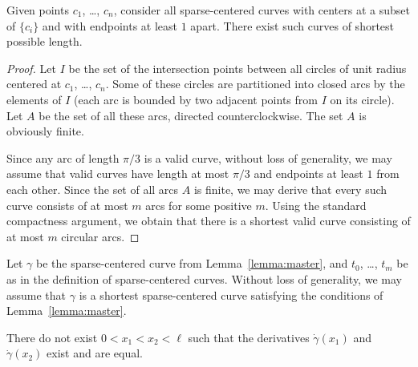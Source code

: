 \begin{observation}
Given points $c_1$, \ldots, $c_n$, consider all sparse-centered curves with centers at a subset of $\{c_i\}$ and with endpoints at least $1$ apart.
There exist such curves of shortest possible length.
\end{observation}

\begin{proof}
%
Let $I$ be the set of the intersection points between all circles of unit radius centered at $c_1$, \ldots, $c_n$. Some of these circles are partitioned into closed arcs by the elements of $I$ (each arc is bounded by two adjacent points from $I$ on its circle). Let $A$ be the set of all these arcs, directed counterclockwise. The set $A$ is obviously finite.

Since any arc of length $\pi/3$ is a valid curve, without loss of generality, we may assume that valid curves have length at most $\pi/3$ and endpoints at least $1$ from each other. Since the set of all arcs $A$ is finite, we may derive that every such curve consists of at most $m$ arcs for some positive $m$.
Using the standard compactness argument, we obtain that there is a shortest valid curve consisting of at most $m$ circular arcs.
\end{proof}

Let $\gamma$ be the sparse-centered curve from Lemma~\ref{lemma:master}, and $t_0$, \ldots, $t_m$ be as in the definition of sparse-centered curves.
Without loss of generality, we may assume that $\gamma$ is a shortest sparse-centered curve satisfying the conditions of Lemma~\ref{lemma:master}.

\begin{observation}
There do not exist $0 < x_1 < x_2 < \ell$ such that the derivatives $\dot{\gamma}(x_1)$ and $\dot{\gamma}(x_2)$ exist and are equal.
\end{observation}

